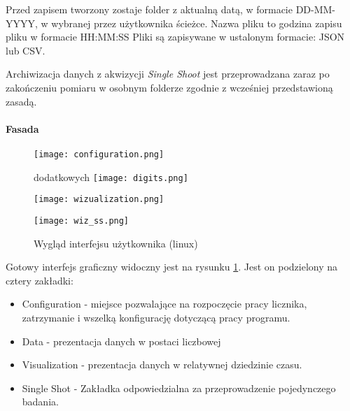 Przed zapisem tworzony zostaje folder z aktualną datą, w formacie DD-MM-YYYY, w wybranej przez użytkownika ścieżce. Nazwa pliku to godzina zapisu pliku w formacie HH:MM:SS
Pliki są zapisywane w ustalonym formacie: JSON lub CSV.

Archiwizacja danych z akwizycji \textit{Single Shoot} jest przeprowadzana zaraz po zakończeniu pomiaru w osobnym folderze zgodnie z wcześniej przedstawioną zasadą. 

\paragraph{Fasada}
\begin{figure}
        \begin{multicols}{2}
        
        \texttt{[image: configuration.png]}\par
        
        dodatkowych
        \texttt{[image: digits.png]}\par
        
        
        \end{multicols}\hfill
        
        \begin{multicols}{2}
        
        
        \texttt{[image: wizualization.png]}\par
        
        
        \texttt{[image: wiz\_ss.png]}\par
        
        \end{multicols}
        \caption{Wygląd interfejsu użytkownika (linux)}
        \label{Gui pic}
        \end{figure}

Gotowy interfejs graficzny widoczny jest na rysunku \ref{Gui pic}. Jest on podzielony na cztery zakładki:
\begin{itemize}
        \item Configuration - miejsce pozwalające na rozpoczęcie pracy licznika, zatrzymanie i wszelką konfigurację dotyczącą pracy programu. 
        \item Data - prezentacja danych w postaci liczbowej 
        \item Visualization - prezentacja danych w relatywnej dziedzinie czasu. 
        \item Single Shot - Zakładka odpowiedzialna za przeprowadzenie pojedynczego badania.
\end{itemize}

